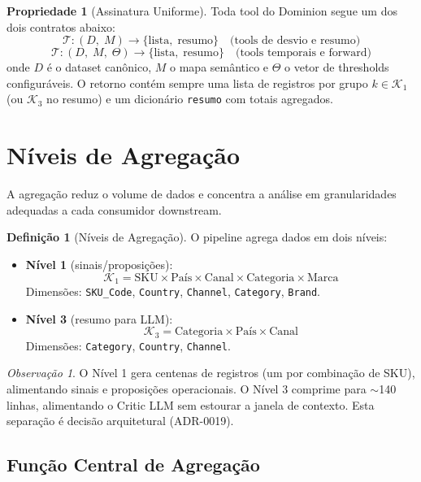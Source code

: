 \documentclass[a4paper, 12pt]{report}
\theoremstyle{definition}
\newtheorem{definicao}{Defini\c{c}\~ao}[chapter]
\newtheorem{propriedade}{Propriedade}[chapter]
\theoremstyle{remark}
\newtheorem{observacao}{Observa\c{c}\~ao}[chapter]
\newcommand{\tool}{\mathcal{T}}
\begin{document}
\begin{propriedade}[Assinatura Uniforme]
  Toda tool do Dominion segue um dos dois contratos abaixo:
  \[
    \tool : (D,\; M) \to \{\text{lista},\; \text{resumo}\}
    \quad \text{(tools de desvio e resumo)}
  \]
  \[
    \tool : (D,\; M,\; \Theta) \to \{\text{lista},\; \text{resumo}\}
    \quad \text{(tools temporais e forward)}
  \]
  onde $D$ \'e o dataset can\^onico, $M$ o mapa sem\^antico e $\Theta$ o vetor
  de thresholds configur\'aveis. O retorno cont\'em sempre uma lista de
  registros por grupo $k \in \mathcal{K}_1$ (ou $\mathcal{K}_3$ no resumo)
  e um dicion\'ario \texttt{resumo} com totais agregados.
\end{propriedade}


\section{N\'iveis de Agrega\c{c}\~ao}

A agrega\c{c}\~ao reduz o volume de dados e concentra a an\'alise
em granularidades adequadas a cada consumidor downstream.

\begin{definicao}[N\'iveis de Agrega\c{c}\~ao]
  O pipeline agrega dados em dois n\'iveis:
  \begin{itemize}
    \item \textbf{N\'ivel 1} (sinais/proposi\c{c}\~oes):
      \[
        \mathcal{K}_1 = \text{SKU} \times \text{Pa\'is} \times \text{Canal}
        \times \text{Categoria} \times \text{Marca}
      \]
      Dimens\~oes: \texttt{SKU\_Code}, \texttt{Country}, \texttt{Channel},
      \texttt{Category}, \texttt{Brand}.
    \item \textbf{N\'ivel 3} (resumo para LLM):
      \[
        \mathcal{K}_3 = \text{Categoria} \times \text{Pa\'is} \times \text{Canal}
      \]
      Dimens\~oes: \texttt{Category}, \texttt{Country}, \texttt{Channel}.
  \end{itemize}
\end{definicao}

\begin{observacao}
  O N\'ivel 1 gera centenas de registros (um por combina\c{c}\~ao de SKU),
  alimentando sinais e proposi\c{c}\~oes operacionais. O N\'ivel 3 comprime
  para $\sim$140 linhas, alimentando o Critic LLM sem estourar a janela
  de contexto. Esta separa\c{c}\~ao \'e decis\~ao arquitetural (ADR-0019).
\end{observacao}

\subsection{Fun\c{c}\~ao Central de Agrega\c{c}\~ao}
\end{document}
